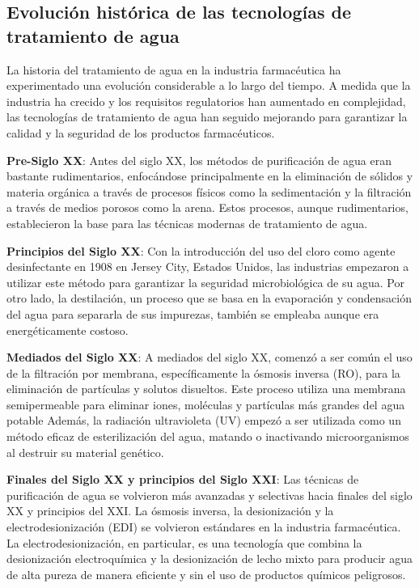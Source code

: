 \subsection{Evolución histórica de las tecnologías de tratamiento de agua}

La historia del tratamiento de agua en la industria farmacéutica ha experimentado una evolución considerable a lo largo del tiempo. A medida que la industria ha crecido y los requisitos regulatorios han aumentado en complejidad, las tecnologías de tratamiento de agua han seguido mejorando para garantizar la calidad y la seguridad de los productos farmacéuticos.


\textbf{Pre-Siglo XX}: Antes del siglo XX, los métodos de purificación de agua eran bastante rudimentarios, enfocándose principalmente en la eliminación de sólidos y materia orgánica a través de procesos físicos como la sedimentación y la filtración a través de medios porosos como la arena. Estos procesos, aunque rudimentarios, establecieron la base para las técnicas modernas de tratamiento de agua.

\textbf{Principios del Siglo XX}: Con la introducción del uso del cloro como agente desinfectante en 1908 en Jersey City, Estados Unidos, las industrias empezaron a utilizar este método para garantizar la seguridad microbiológica de su agua. Por otro lado, la destilación, un proceso que se basa en la evaporación y condensación del agua para separarla de sus impurezas, también se empleaba aunque era energéticamente costoso.

\textbf{Mediados del Siglo XX}: A mediados del siglo XX, comenzó a ser común el uso de la filtración por membrana, específicamente la ósmosis inversa (RO), para la eliminación de partículas y solutos disueltos. Este proceso utiliza una membrana semipermeable para eliminar iones, moléculas y partículas más grandes del agua potable Además, la radiación ultravioleta (UV) empezó a ser utilizada como un método eficaz de esterilización del agua, matando o inactivando microorganismos al destruir su material genético.

\textbf{Finales del Siglo XX y principios del Siglo XXI}: Las técnicas de purificación de agua se volvieron más avanzadas y selectivas hacia finales del siglo XX y principios del XXI. La ósmosis inversa, la desionización y la electrodesionización (EDI) se volvieron estándares en la industria farmacéutica. La electrodesionización, en particular, es una tecnología que combina la desionización electroquímica y la desionización de lecho mixto para producir agua de alta pureza de manera eficiente y sin el uso de productos químicos peligrosos.


